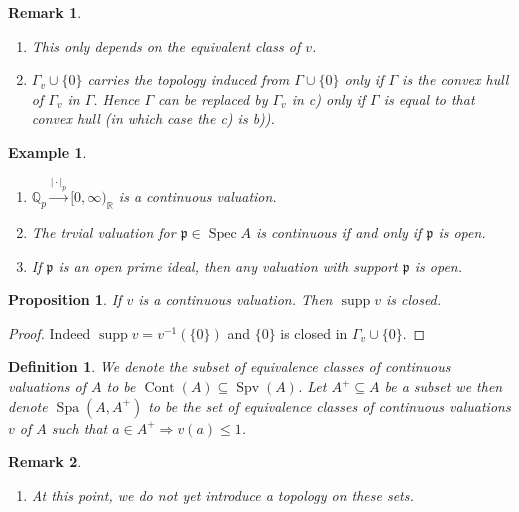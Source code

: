 \documentclass[8pt]{article}
\numberwithin{equation}{section}
\newtheorem{proposition}{Proposition}[subsection]
\newtheorem{definition}{Definition}[subsection]
\newtheorem{remark}{Remark}[subsection]
\newtheorem{example}{Example}[subsection]
\DeclareMathOperator{\supp}{supp}
\DeclareMathOperator{\Spec}{Spec}
\DeclareMathOperator{\Spa}{Spa}
\DeclareMathOperator{\Spv}{Spv}
\DeclareMathOperator{\Cont}{Cont}
\newcommand{\R}[0]{\mathbb{R}}
\newcommand{\Q}[0]{\mathbb{Q}}
\newcommand{\T}[0]{\mathbb{T}}
\newcommand{\p}[0]{\mathfrak{p}}
\newcommand{\ab}[1]{\vert #1 \vert}
\begin{document}
\begin{remark}$\:$
    \begin{enumerate}
        \item  This only depends on the equivalent class of $v$.
        \item $\Gamma_v\cup\{0\}$ carries the topology induced from $\Gamma\cup\{0\}$ only if $\Gamma$ is the convex hull of $\Gamma_v$ in $\Gamma$. Hence $\Gamma$ can be replaced by $\Gamma_v$ in c) only if $\Gamma$ is equal to that convex hull (in which case the c) is b)).
    \end{enumerate}
\end{remark}
\begin{example}$\:$
    \label{example_12_1}
    \begin{enumerate}
        \item $\Q_p\stackrel{\ab{\cdot}_p}{\to}[0,\infty)_\R$ is a continuous valuation.
        \item The trvial valuation for $\p\in\Spec A$ is continuous if and only if $\p$ is open.
        \item If $\p$ is an open prime ideal, then any valuation with support $\p$ is open.
    \end{enumerate}
\end{example}
\begin{proposition}
    \label{fact_12_2}
    If $v$ is a continuous valuation. Then $\supp v$ is closed.
\end{proposition}
\begin{proof}
    Indeed $\supp v = v^{-1}(\{0\})$ and $\{0\}$ is closed in $\Gamma_v\cup\{0\}$. 
\end{proof}
\begin{definition}
    \label{definition_12_2}
    We denote the subset of equivalence classes of continuous valuations of $A$ to be $\Cont(A)\subseteq\Spv(A)$.
    Let $A^+\subseteq A$ be a subset we then denote $\Spa(A,A^+)$ to be the set of equivalence classes of continuous valuations $v$ of $A$ such that $a\in A^+\Rightarrow v(a)\leq 1$.
\end{definition}
\begin{remark}$\:$
    \begin{enumerate}
        \item At this point, we do not yet introduce a topology on these sets.
    \end{enumerate}
\end{remark}
\end{document}
